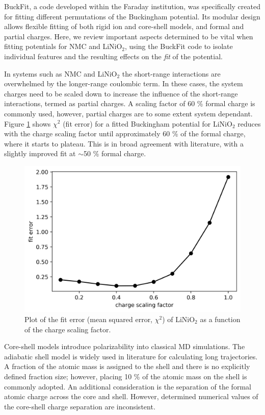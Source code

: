 \documentclass[journal=jacsat,manuscript=article]{achemso}
\begin{document}
BuckFit,\cite{Morgan2020BuckFit} a code developed within the Faraday institution, was specifically created for fitting different permutations of the Buckingham potential. Its modular design allows flexible fitting of both rigid ion and core-shell models, and formal and partial charges. Here, we review important aspects determined to be vital when fitting potentials for NMC and LiNiO$_2$, using the BuckFit code to isolate individual features and the resulting effects on the \textit{fit} of the potential.

In systems such as NMC and LiNiO$_2$ the short-range interactions are overwhelmed by the longer-range coulombic term. In these cases, the system charges need to be scaled down to increase the influence of the short-range interactions, termed as partial charges. A scaling factor of 60 \% formal charge is commonly used, \cite{pedone2006potentials} however, partial charges are to some extent system dependant. Figure \ref{fig:charge_scaling} shows $\chi^2$ (fit error) for a fitted Buckingham potential for LiNiO$_2$ reduces with the charge scaling factor until approximately 60 \% of the formal charge, where it starts to plateau. This is in broad agreement with literature, with a slightly improved fit at $\sim$50 \% formal charge.

\begin{figure}[h]
    \centering
    \includegraphics[scale=0.65]{Figures/charge_scaling_error_plot.png}
    \caption{\label{fig:charge_scaling} Plot of the fit error (mean squared error, $\chi^2$) of LiNiO$_2$ as a function of the charge scaling factor.}
\end{figure}

Core-shell models introduce polarizability into classical MD simulations. The adiabatic shell model \cite{Mitchell_1993} is widely used in literature \cite{Hart1998, Fisher2010, Lewis_1985,Ammundsen1999, Kerisit2014, He2019,lee2012atomistic} for calculating long trajectories. A fraction of the atomic mass is assigned to the shell and there is no explicitly defined fraction size; however, placing 10 \% of the atomic mass on the shell is commonly adopted. \cite{PLIMPTON19951,todorov2006dl_poly_3} An additional consideration is the separation of the formal atomic charge across the core and shell. However, determined numerical values of the core-shell charge separation are inconsistent. \cite{wang2014molecular,escribano2017enhancing,lee2012atomistic,Lee2013_lithium,dai2019comparison}
\end{document}
